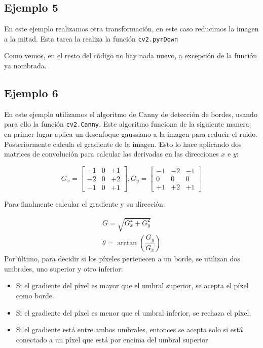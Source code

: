\documentclass[a4paper,openright, 12pt]{book}
\begin{document}
\newpage

\subsection*{Ejemplo 5}
En este ejemplo realizamos otra transformación, en este caso reducimos la imagen a la mitad. Esta tarea la realiza la función \lstinline|cv2.pyrDown|

Como vemos, en el resto del código no hay nada nuevo, a excepción de la función ya nombrada.
\newpage
\subsection*{Ejemplo 6}
En este ejemplo utilizamos el algoritmo de Canny \cite{canny86} de detección de bordes, usando para ello la función \lstinline|cv2.Canny|.
 Este algoritmo funciona de la siguiente manera: en primer lugar aplica un desenfoque gaussiano a la imagen para reducir el ruido. Posteriormente calcula el gradiente de la imagen. Esto lo hace aplicando dos matrices de convolución para calcular las derivadas en las direcciones $x$ e $y$:

\begin{equation*}
G_{x} = \begin{bmatrix} -1 & 0 & +1 \\ -2 & 0 & +2 \\ -1 & 0 & +1 \end{bmatrix},  G_{y} = \begin{bmatrix} -1 & -2 & -1 \\ 0 & 0 & 0 \\ +1 & +2 & +1 \end{bmatrix}
\end{equation*}

Para finalmente calcular el gradiente y su dirección:

\begin{equation*}
\begin{array}{l} G = \sqrt{ G_{x}^{2} + G_{y}^{2} } \\ \theta = \arctan(\dfrac{ G_{y} }{ G_{x} }) \end{array}
\end{equation*}
Por último, para decidir si los píxeles pertenecen a un borde, se utilizan dos umbrales, uno superior y otro inferior:
\begin{itemize}
\item Si el gradiente del píxel es mayor que el umbral superior, se acepta el píxel como borde.
\item Si el gradiente del píxel es menor que el umbral inferior, se rechaza el píxel.
\item Si el gradiente está entre ambos umbrales, entonces se acepta solo si está conectado a un píxel que está por encima del umbral superior.
\end{itemize}
\end{document}

